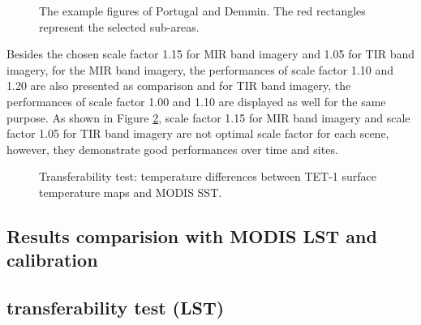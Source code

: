 \begin{figure}[!htbp]
\centering
{}
\vspace{0.5in}
\caption{The example figures of Portugal and Demmin. The red rectangles represent the selected sub-areas.}
\label{fig:portugal&demmin}
\end{figure}

\noindent Besides the chosen scale factor 1.15 for MIR band imagery and 1.05 for TIR band imagery, for the MIR band imagery, the performances of scale factor 1.10 and 1.20 are also presented as comparison and for TIR band imagery, the performances of scale factor 1.00 and 1.10 are displayed as well for the same purpose. As shown in Figure \ref{fig:SST_test}, scale factor 1.15 for MIR band imagery and scale factor 1.05 for TIR band imagery are not optimal scale factor for each scene, however, they demonstrate good performances over time and sites.\\

\begin{figure}[!htbp]
\centering
{}
\hspace{0.5in}
\caption{Transferability test: temperature differences between TET-1 surface temperature maps and MODIS SST.}
\label{fig:SST_test}
\end{figure}


\subsection{Results comparision with MODIS LST and calibration}


\subsection{transferability test (LST)}


